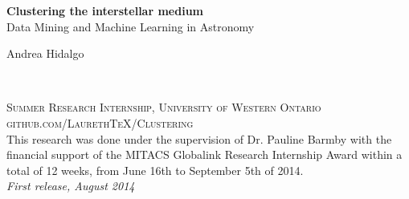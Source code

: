 \documentclass[11pt,fleqn]{book} %
\begin{document}

\begingroup
\thispagestyle{empty}
\centering
\vspace*{5cm}
\par\normalfont\fontsize{35}{35}\sffamily\selectfont
\textbf{Clustering the interstellar medium}\\
{\LARGE Data Mining and Machine Learning in Astronomy}\par %
\vspace*{1cm}
{\Huge Andrea Hidalgo}\par %
\endgroup


\newpage
~\vfill
\thispagestyle{empty}


\noindent \textsc{Summer Research Internship, University of Western Ontario}\\

\noindent \textsc{github.com/LaurethTeX/Clustering}\\ %

\noindent This research was done under the supervision of Dr. Pauline Barmby with the financial support of the MITACS Globalink Research Internship Award within a total of 12 weeks, from June 16th to September 5th of 2014.\\ %

\noindent \textit{First release, August 2014} %



\pagestyle{empty} %

\tableofcontents %
\end{document}
